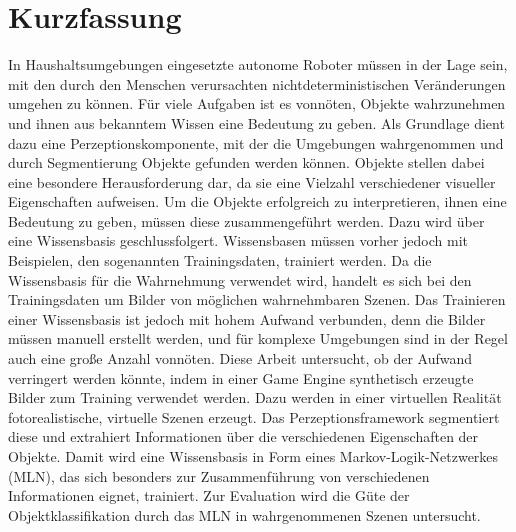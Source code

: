 \chapter*{Kurzfassung} 

In Haushaltsumgebungen eingesetzte autonome Roboter müssen in der Lage sein, mit den durch den Menschen verursachten nichtdeterministischen Veränderungen umgehen zu können. Für viele Aufgaben ist es vonnöten, Objekte wahrzunehmen und ihnen aus bekanntem Wissen eine Bedeutung zu geben. Als Grundlage dient dazu eine Perzeptionskomponente, mit der die Umgebungen wahrgenommen und durch Segmentierung Objekte gefunden werden können. Objekte stellen dabei eine besondere Herausforderung dar, da sie eine Vielzahl verschiedener visueller Eigenschaften aufweisen. Um die Objekte erfolgreich zu interpretieren, ihnen eine Bedeutung zu geben, müssen diese zusammengeführt werden. Dazu wird über eine Wissensbasis geschlussfolgert. Wissensbasen müssen vorher jedoch mit Beispielen, den sogenannten Trainingsdaten, trainiert werden. Da die Wissensbasis für die Wahrnehmung verwendet wird, handelt es sich bei den Trainingsdaten um Bilder von möglichen wahrnehmbaren Szenen. Das Trainieren einer Wissensbasis ist jedoch mit hohem Aufwand verbunden, denn die Bilder müssen manuell erstellt werden, und für komplexe Umgebungen sind in der Regel auch eine große Anzahl vonnöten. Diese Arbeit untersucht, ob der Aufwand verringert werden könnte, indem in einer Game Engine synthetisch erzeugte Bilder zum Training verwendet werden. Dazu werden in einer virtuellen Realität fotorealistische, virtuelle Szenen erzeugt. Das Perzeptionsframework \robosherlock segmentiert diese und extrahiert Informationen über die verschiedenen Eigenschaften der Objekte. Damit wird eine Wissensbasis in Form eines Markov-Logik-Netzwerkes (MLN), das sich besonders zur Zusammenführung von verschiedenen Informationen eignet, trainiert. Zur Evaluation wird die Güte der Objektklassifikation durch das MLN in wahrgenommenen Szenen untersucht. 
